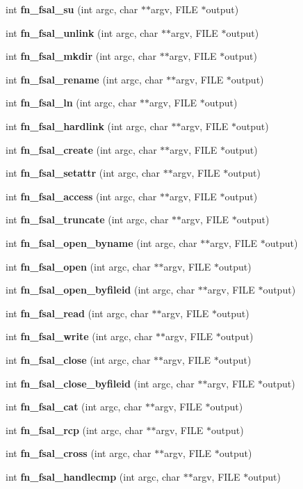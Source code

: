 \begin{DoxyCompactItemize}
\item 
int {\bf fn\_\-fsal\_\-su} (int argc, char $\ast$$\ast$argv, FILE $\ast$output)
\item 
int {\bf fn\_\-fsal\_\-unlink} (int argc, char $\ast$$\ast$argv, FILE $\ast$output)
\item 
int {\bf fn\_\-fsal\_\-mkdir} (int argc, char $\ast$$\ast$argv, FILE $\ast$output)
\item 
int {\bf fn\_\-fsal\_\-rename} (int argc, char $\ast$$\ast$argv, FILE $\ast$output)
\item 
int {\bf fn\_\-fsal\_\-ln} (int argc, char $\ast$$\ast$argv, FILE $\ast$output)
\item 
int {\bf fn\_\-fsal\_\-hardlink} (int argc, char $\ast$$\ast$argv, FILE $\ast$output)
\item 
int {\bf fn\_\-fsal\_\-create} (int argc, char $\ast$$\ast$argv, FILE $\ast$output)
\item 
int {\bf fn\_\-fsal\_\-setattr} (int argc, char $\ast$$\ast$argv, FILE $\ast$output)
\item 
int {\bf fn\_\-fsal\_\-access} (int argc, char $\ast$$\ast$argv, FILE $\ast$output)
\item 
int {\bf fn\_\-fsal\_\-truncate} (int argc, char $\ast$$\ast$argv, FILE $\ast$output)
\item 
int {\bf fn\_\-fsal\_\-open\_\-byname} (int argc, char $\ast$$\ast$argv, FILE $\ast$output)
\item 
int {\bf fn\_\-fsal\_\-open} (int argc, char $\ast$$\ast$argv, FILE $\ast$output)
\item 
int {\bf fn\_\-fsal\_\-open\_\-byfileid} (int argc, char $\ast$$\ast$argv, FILE $\ast$output)
\item 
int {\bf fn\_\-fsal\_\-read} (int argc, char $\ast$$\ast$argv, FILE $\ast$output)
\item 
int {\bf fn\_\-fsal\_\-write} (int argc, char $\ast$$\ast$argv, FILE $\ast$output)
\item 
int {\bf fn\_\-fsal\_\-close} (int argc, char $\ast$$\ast$argv, FILE $\ast$output)
\item 
int {\bf fn\_\-fsal\_\-close\_\-byfileid} (int argc, char $\ast$$\ast$argv, FILE $\ast$output)
\item 
int {\bf fn\_\-fsal\_\-cat} (int argc, char $\ast$$\ast$argv, FILE $\ast$output)
\item 
int {\bf fn\_\-fsal\_\-rcp} (int argc, char $\ast$$\ast$argv, FILE $\ast$output)
\item 
int {\bf fn\_\-fsal\_\-cross} (int argc, char $\ast$$\ast$argv, FILE $\ast$output)
\item 
int {\bf fn\_\-fsal\_\-handlecmp} (int argc, char $\ast$$\ast$argv, FILE $\ast$output)
\end{DoxyCompactItemize}



